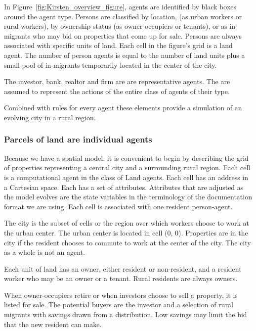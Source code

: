 In Figure~\ref{fig:Kirsten_overview_figure}, agents are identified by black boxes around the agent type. Persons are classified by location, (as urban workers or rural workers), by ownership status (as owner-occupiers or tenants), or as in-migrants who may bid on properties that come up for sale. %
Persons  are always associated with specific units of land. Each cell in the figure's grid is a land agent.  The number of person agents is equal to the number of land units plus a small pool of in-migrants temporarily located in the center of the city.
 
The investor,  bank, realtor and firm are are \glspl{representative agent}. The are assumed to represent the actions of the entire class of agents of their type. 
 
Combined with rules for every agent these elements provide a simulation of an evolving city in a rural region. 

\subsubsection{Parcels of land are individual agents}

Because we have a spatial model, it is convenient to begin by describing the grid of properties representing a central city and a surrounding rural region. Each cell is a computational agent in the class of Land agents. Each cell has an address in a Cartesian space. Each has a set of attributes. Attributes that are adjusted as the model evolves are the state variables in the terminology of the documentation format we are using. Each cell is associated with one resident person-agent. %

The city is the subset of cells or the region over which workers choose to work at the urban center. The urban center is located in cell (0, 0). Properties are in the city if the resident chooses to commute to work at the center of the city.  The city as a whole is not an agent. 

Each unit of land has an owner, either resident or non-resident, and a resident worker who may be an owner or a tenant. Rural residents are always owners.  

When owner-occupiers retire or when investors choose to sell a property, it is listed for sale. The potential buyers are the investor and a selection of rural migrants with savings drawn from a distribution.  Low savings may limit the bid that the new resident can make. 


